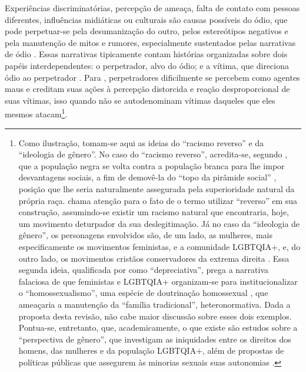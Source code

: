\documentclass[portuguese]{textolivre}
\begin{document}
Experiências discriminatórias, percepção de ameaça, falta de contato com pessoas diferentes, influências midiáticas ou culturais são causas possíveis do ódio, que pode perpetuar-se pela desumanização do outro, pelos estereótipos negativos e pela manutenção de mitos e rumores, especialmente sustentados pelas narrativas de ódio \cite{sternberg2005}. Essas narrativas tipicamente contam histórias organizadas sobre dois papéis interdependentes: o perpetrador, alvo do ódio; e a vítima, que direciona ódio ao perpetrador \cite{baumeister2001evil}. Para \textcite{baumeister2001evil}, perpetradores dificilmente se percebem como agentes maus e creditam suas ações à percepção distorcida e reação desproporcional de suas vítimas, isso quando não se autodenominam vítimas daqueles que eles mesmos atacam\footnote{Como ilustração, tomam-se aqui as ideias do “racismo reverso” e da “ideologia de gênero”. No caso do “racismo reverso”, acredita-se, segundo \textcite{almeida2019racismo}, que a população negra se volta contra a população branca para lhe impor desvantagens sociais, a fim de demovê-la do “topo da pirâmide social” \cite[p.30]{schwarcz2019}, posição que lhe seria naturalmente assegurada pela superioridade natural da própria raça. \textcite{almeida2019racismo} chama atenção para o fato de o termo utilizar “reverso” em sua construção, assumindo-se existir um racismo natural que encontraria, hoje, um movimento deturpador da sua deslegitimação. Já no caso da “ideologia de gênero”, os personagens envolvidos são, de um lado, as mulheres, mais especificamente os movimentos feministas, e a comunidade LGBTQIA+, e, do outro lado, os movimentos cristãos conservadores da extrema direita \cite{machado2018christian}. Essa segunda ideia, qualificada por \textcite{schwarcz2019} como “depreciativa”, prega a narrativa falaciosa de que feministas e LGBTQIA+ organizam-se para institucionalizar o “homossexualismo”, uma espécie de doutrinação homossexual \cite{machado2018christian}, que ameaçaria a manutenção da “família tradicional”, heteronormativa. Dada a proposta desta revisão, não cabe maior discussão sobre esses dois exemplos. Pontua-se, entretanto, que, academicamente, o que existe são estudos sobre a “perspectiva de gênero”, que investigam as iniquidades entre os direitos dos homens, das mulheres e da população LGBTQIA+, além de propostas de políticas públicas que assegurem às minorias sexuais suas autonomias \cite{machado2018christian}.}.
\end{document}
